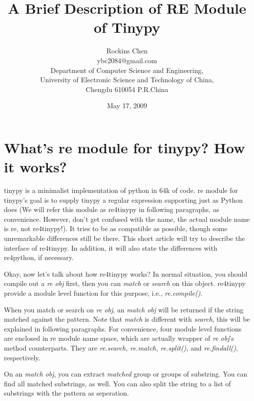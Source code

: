 \documentclass[12pt]{article}
\begin{document}
\title{\huge{A Brief Description of RE Module of Tinypy}}
\author{Rockins Chen\\
ybc2084@gmail.com\\
Department of Computer Science and Engineering,\\
University of Electronic Science and Technology of China,\\
Chengdu 610054 P.R.China}
\date{May 17, 2009}
\maketitle

\parskip 10pt

\section{What's re module for tinypy? How it works?}

\large{tinypy is a minimalist implementation of python in 64k of code. re module for tinypy's goal is to supply tinypy a regular expression supporting just as Python does (We will refer this module as re4tinypy in following paragraphs, as convenience. However, don't get confused with the name, the actual module name is re, not re4tinypy!). It tries to be as compatible as possible, though some unremarkable differences still be there. This short article will try to describe the interface of re4tinypy. In addition, it will also state the differences with re4python, if necessary.}


Okay, now let's talk about how re4tinypy works? In normal situation, you should compile out a {\em re obj} first, then you can {\em match} or {\em search} on this object. re4tinypy provide a module level function for this purpose, i.e., {\em re.compile()}.


When you match or search on {\em re obj}, an {\em match obj} will be returned if the string matched against the pattern. Note that {\em match} is different with {\em search}, this will be explained in following paragraphs. For convenience, four module level functions are enclosed in re module name space, which are actually wrapper of {\em re obj}'s method counterparts. They are {\em re.search, re.match, re.split(),} and {\em re.findall()}, respectively.


On an {\em match obj}, you can extract {\em matched} group or groups of substring. You can find all matched substrings, as well. You can also split the string to a list of substrings with the pattern as seperation. 
\end{document}
